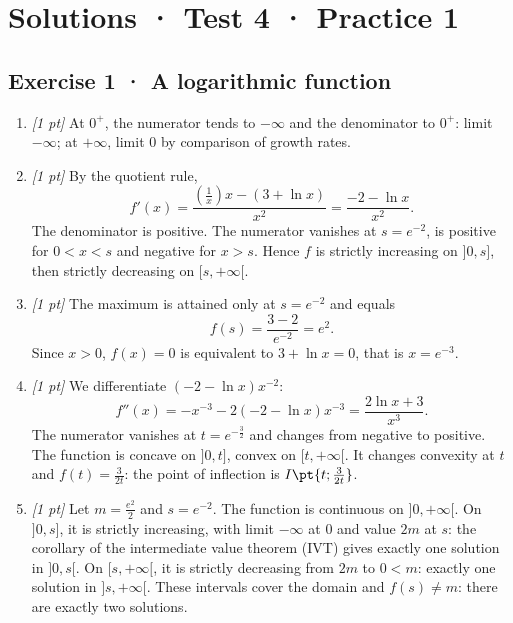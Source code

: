 \ifmxteacher\mxnewpage

\section*{Solutions · Test 4 · Practice 1}\label{cor:6-1}

\subsection*{Exercise 1 · A logarithmic function}\begin{enumerate}

\item \textit{[1 pt]} At $0^+$, the numerator tends to $-\infty$ and the denominator to $0^+$: limit $-\infty$; at $+\infty$, limit $0$ by comparison of growth rates.

\item \textit{[1 pt]} By the quotient rule,
\[f'(x)=\frac{(\frac{1}{x})x-(3+\ln x)}{x^2}=\frac{-2-\ln x}{x^2}.\]
The denominator is positive. The numerator vanishes at $s=e^{-2}$, is positive for $0<x<s$ and negative for $x>s$. Hence $f$ is strictly increasing on $]0,s]$, then strictly decreasing on $[s,+\infty[$.

\item \textit{[1 pt]} The maximum is attained only at $s=e^{-2}$ and equals
\[f(s)=\frac{3- 2}{e^{-2}}=e^{2}.\]
Since $x>0$, $f(x)=0$ is equivalent to $3+\ln x=0$, that is $x=e^{-3}$.

\item \textit{[1 pt]} We differentiate $(-2-\ln x)x^{-2}$:
\[f''(x)=-x^{-3}-2(-2-\ln x)x^{-3}=\frac{2\ln x+3}{x^3}.\]
The numerator vanishes at $t=e^{-\frac{3}{2}}$ and changes from negative to positive. The function is concave on $]0,t]$, convex on $[t,+\infty[$. It changes convexity at $t$ and $f(t)=\frac{3}{2t}$: the point of inflection is $I\pt{t;\frac{3}{2t}}$.

\item \textit{[1 pt]} Let $m=\frac{e^{2}}{2}$ and $s=e^{-2}$. The function is continuous on $]0,+\infty[$. On $]0,s]$, it is strictly increasing, with limit $-\infty$ at $0$ and value $2m$ at $s$: the corollary of the intermediate value theorem (IVT) gives exactly one solution in $]0,s[$. On $[s,+\infty[$, it is strictly decreasing from $2m$ to $0<m$: exactly one solution in $]s,+\infty[$. These intervals cover the domain and $f(s)\ne m$: there are exactly two solutions.

\end{enumerate}

